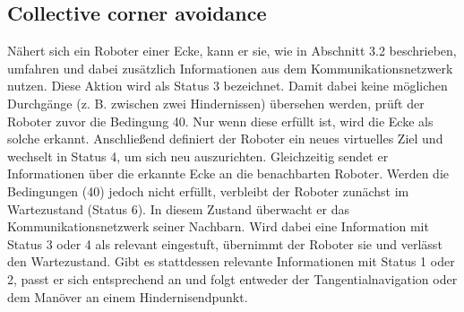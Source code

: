 \documentclass[conference]{IEEEtran}
\begin{document}
\subsection{Collective corner avoidance}
Nähert sich ein Roboter einer Ecke, kann er sie, wie in Abschnitt 3.2 beschrieben, umfahren und dabei zusätzlich Informationen aus dem Kommunikationsnetzwerk nutzen. Diese Aktion wird als Status 3 bezeichnet. Damit dabei keine möglichen Durchgänge (z. B. zwischen zwei Hindernissen) übersehen werden, prüft der Roboter zuvor die Bedingung 40. Nur wenn diese erfüllt ist, wird die Ecke als solche erkannt.
Anschließend definiert der Roboter ein neues virtuelles Ziel und wechselt in Status 4, um sich neu auszurichten. Gleichzeitig sendet er Informationen über die erkannte Ecke an die benachbarten Roboter.
Werden die Bedingungen (40) jedoch nicht erfüllt, verbleibt der Roboter zunächst im Wartezustand (Status 6). In diesem Zustand überwacht er das Kommunikationsnetzwerk seiner Nachbarn. Wird dabei eine Information mit Status 3 oder 4 als relevant eingestuft, übernimmt der Roboter sie und verlässt den Wartezustand. Gibt es stattdessen relevante Informationen mit Status 1 oder 2, passt er sich entsprechend an und folgt entweder der Tangentialnavigation oder dem Manöver an einem Hindernisendpunkt.




\end{document}
